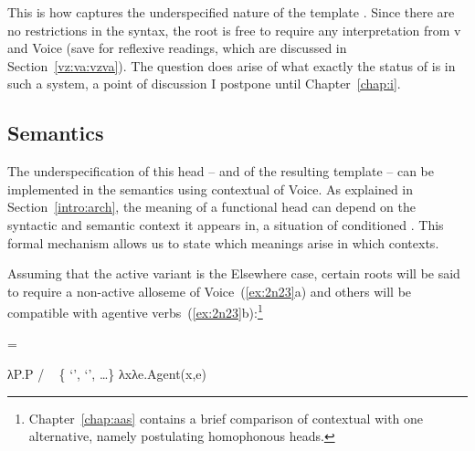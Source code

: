 \begin{exe}
\begin{xlist}
\begin{exe}
\begin{xlist}
\begin{exe}
\begin{xlist}
\begin{exe}
\begin{exe}
\begin{xlist}
\begin{exe}
\begin{xlist}
\begin{exe}
\begin{xlist}
\begin{exe}
\begin{xlist}
\begin{exe}
\begin{xlist}
\begin{exe}
\begin{xlist}
\begin{exe}
\begin{xlist}
\begin{exe}
\begin{xlist}
\begin{xlist}
\begin{exe}
\begin{xlist}
\begin{exe}
\begin{xlist}
\begin{exe}
\begin{xlist}
\begin{exe}
\begin{xlist}
\begin{exe}
\begin{xlist}
\begin{exe}
\begin{xlist}
\begin{exe}
\begin{xlist}
\begin{exe}
\begin{xlist}
 	 \z
\z 		

This is how  captures the underspecified nature of the template {\tkal}. Since there are no restrictions in the syntax, the root is free to require any interpretation from v and Voice (save for reflexive readings, which are discussed in Section~\ref{vz:va:vzva}). The question does arise of what exactly the status of  is in such a system, a point of discussion I postpone until Chapter~\ref{chap:i}.

		
		\subsection{Semantics} \label{voice:voice:sem}
The underspecification of this head -- and of the resulting template -- can be implemented in the semantics using contextual  of Voice. As explained in Section~\ref{intro:arch}, the meaning of a functional head can depend on the syntactic and semantic context it appears in, a situation of conditioned . This formal mechanism allows us to state which meanings arise in which contexts.

Assuming that the active variant is the Elsewhere case, certain roots will be said to require a non-active alloseme of Voice~(\ref{ex:2n23}a) and others will be compatible with agentive verbs~(\ref{ex:2n23}b):\footnote{Chapter~\ref{chap:aas} contains a brief comparison of contextual  with one alternative, namely postulating homophonous heads.}
 \begin{exe}
 \ex  \label{ex:2n23} =  
 \begin{xlist} 
 	\ex  λP.P \phantom{agent(x,e)xxx} / \trace~ \{  `',  `', \dots \} 
 	\ex  λxλe.Agent(x,e) 
 \z
\z 


\end{xlist}
\end{exe}
\end{xlist}
\end{exe}
\end{xlist}
\end{exe}
\end{xlist}
\end{exe}
\end{xlist}
\end{exe}
\end{xlist}
\end{exe}
\end{xlist}
\end{exe}
\end{xlist}
\end{exe}
\end{xlist}
\end{exe}
\end{xlist}
\end{xlist}
\end{exe}
\end{xlist}
\end{exe}
\end{xlist}
\end{exe}
\end{xlist}
\end{exe}
\end{xlist}
\end{exe}
\end{xlist}
\end{exe}
\end{xlist}
\end{exe}
\end{xlist}
\end{exe}
\end{exe}
\end{xlist}
\end{exe}
\end{xlist}
\end{exe}
\end{xlist}
\end{exe}
